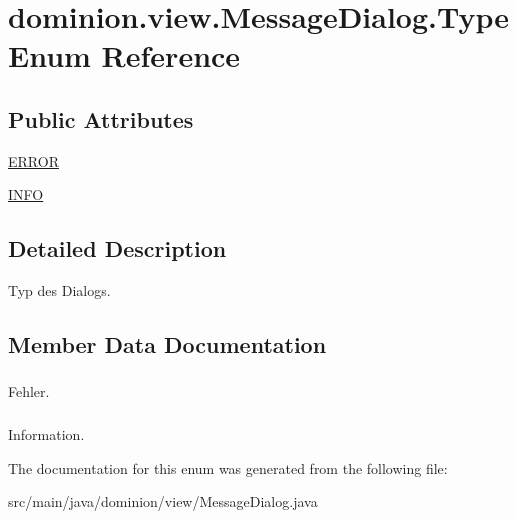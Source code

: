 \hypertarget{enumdominion_1_1view_1_1MessageDialog_1_1Type}{\section{dominion.\-view.\-Message\-Dialog.\-Type \-Enum \-Reference}
\label{enumdominion_1_1view_1_1MessageDialog_1_1Type}
}
\subsection*{\-Public \-Attributes}
\begin{DoxyCompactItemize}
\item 
\hyperlink{enumdominion_1_1view_1_1MessageDialog_1_1Type_aa65d5dad91c52080a9c64d413ea9dfc1}{\-E\-R\-R\-O\-R}
\item 
\hyperlink{enumdominion_1_1view_1_1MessageDialog_1_1Type_a8bc04edf0f71ab3eea9fac8ac5f36cc9}{\-I\-N\-F\-O}
\end{DoxyCompactItemize}


\subsection{\-Detailed \-Description}
\-Typ des \-Dialogs. 

\subsection{\-Member \-Data \-Documentation}
\hypertarget{enumdominion_1_1view_1_1MessageDialog_1_1Type_aa65d5dad91c52080a9c64d413ea9dfc1}{
\subsubsection[{\-E\-R\-R\-O\-R}]{}}\label{enumdominion_1_1view_1_1MessageDialog_1_1Type_aa65d5dad91c52080a9c64d413ea9dfc1}
\-Fehler. \hypertarget{enumdominion_1_1view_1_1MessageDialog_1_1Type_a8bc04edf0f71ab3eea9fac8ac5f36cc9}{
\subsubsection[{\-I\-N\-F\-O}]{}}\label{enumdominion_1_1view_1_1MessageDialog_1_1Type_a8bc04edf0f71ab3eea9fac8ac5f36cc9}
\-Information. 

\-The documentation for this enum was generated from the following file\-:\begin{DoxyCompactItemize}
\item 
src/main/java/dominion/view/\-Message\-Dialog.\-java\end{DoxyCompactItemize}
